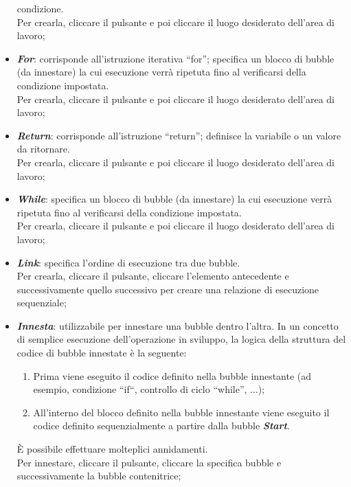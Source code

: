 \documentclass[../ManualeUtente.tex]{subfiles}
\begin{document}
\begin{itemize}
					condizione.\\
					Per crearla, cliccare il pulsante e poi cliccare il luogo desiderato
					dell'area di lavoro;
					\item \textit{\textbf{For}}: corrisponde all'istruzione iterativa ``for''; specifica un
					blocco di bubble (da innestare) la cui esecuzione verrà ripetuta fino al verificarsi della
					condizione impostata.\\
					Per crearla, cliccare il pulsante e poi cliccare il luogo desiderato
					dell'area di lavoro;
					\item \textit{\textbf{Return}}: corrisponde all'istruzione ``return''; definisce la variabile
					o un valore da ritornare.\\
					Per crearla, cliccare il pulsante e poi cliccare il luogo desiderato
					dell'area di lavoro;
					\item \textit{\textbf{While}}: specifica un blocco di bubble (da innestare) la cui esecuzione
					verrà ripetuta fino al verificarsi della condizione impostata.\\
					Per crearla, cliccare il pulsante e poi cliccare il luogo desiderato
					dell'area di lavoro;
					\item \textit{\textbf{Link}}: specifica l'ordine di esecuzione tra due bubble.\\
					Per crearla, cliccare il pulsante, cliccare l'elemento antecedente
					e successivamente quello successivo per creare una relazione di esecuzione sequenziale;
					\item \textit{\textbf{Innesta}}: utilizzabile per innestare una bubble dentro l'altra.
					In un concetto di semplice esecuzione dell'operazione in sviluppo, la
					logica della struttura del codice di bubble innestate è la seguente:
					\begin{enumerate}
						\item Prima viene eseguito il codice definito nella bubble innestante (ad esempio,
						condizione ``if``, controllo di ciclo ``while'', ...);
						\item All'interno del blocco definito nella bubble innestante viene eseguito il codice
						definito sequenzialmente a partire dalla bubble \textit{\textbf{Start}}.
					\end{enumerate}
					È possibile effettuare molteplici annidamenti.\\
					Per innestare, cliccare il pulsante, cliccare la specifica bubble
					e successivamente la bubble contenitrice;
				\end{itemize}
\end{document}
